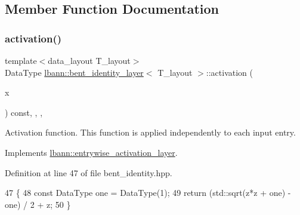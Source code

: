 \subsection{Member Function Documentation}
\mbox{\label{classlbann_1_1bent__identity__layer_a496012ccbb6601afb8de972e943d7942}} 
\subsubsection{\texorpdfstring{activation()}{activation()}}
{\footnotesize\ttfamily template$<$data\+\_\+layout T\+\_\+layout$>$ \\
Data\+Type \hyperlink{classlbann_1_1bent__identity__layer}{lbann\+::bent\+\_\+identity\+\_\+layer}$<$ T\+\_\+layout $>$\+::activation (\begin{DoxyParamCaption}\item[{Data\+Type}]{x }\end{DoxyParamCaption}) const\hspace{0.3cm}{\ttfamily [inline]}, {\ttfamily [override]}, {\ttfamily [protected]}, {\ttfamily [virtual]}}

Activation function. This function is applied independently to each input entry. 

Implements \hyperlink{classlbann_1_1entrywise__activation__layer_a69269401530a2112b66660383464bab9}{lbann\+::entrywise\+\_\+activation\+\_\+layer}.



Definition at line 47 of file bent\+\_\+identity.\+hpp.


\begin{DoxyCode}
47                                                  \{
48     \textcolor{keyword}{const} DataType one = DataType(1);
49     \textcolor{keywordflow}{return} (std::sqrt(z*z + one) - one) / 2 + z;
50   \}
\end{DoxyCode}
\mbox{\label{classlbann_1_1bent__identity__layer_ae331e8e0f830641cba6b3561f5474eb3}} 
